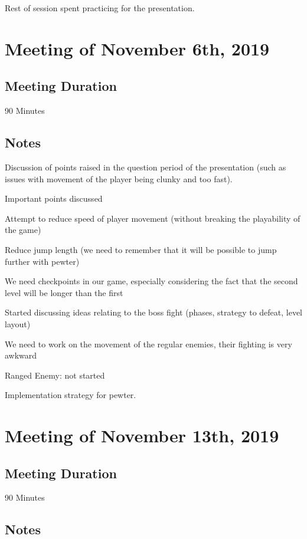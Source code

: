 \documentclass{article}
\begin{document}
Rest of session spent practicing for the presentation.

\section{Meeting of November 6th, 2019}

\subsection{Meeting Duration}
90 Minutes

\subsection{Notes}

Discussion of points raised in the question period of the presentation (such as issues with movement of the player being clunky and too fast).

Important points discussed
\begin{description}
\item Attempt to reduce speed of player movement (without breaking the playability of the game)
\item Reduce jump length (we need to remember that it will be possible to jump further with pewter)
\item We need checkpoints in our game, especially considering the fact that the second level will be longer than the first
\item Started discussing ideas relating to the boss fight (phases, strategy to defeat, level layout)
\item We need to work on the movement of the regular enemies, their fighting is very awkward
\item Ranged Enemy: not started
\item Implementation strategy for pewter.
\end{description}

\section{Meeting of November 13th, 2019}

\subsection{Meeting Duration}
90 Minutes

\subsection{Notes}
\end{document}
